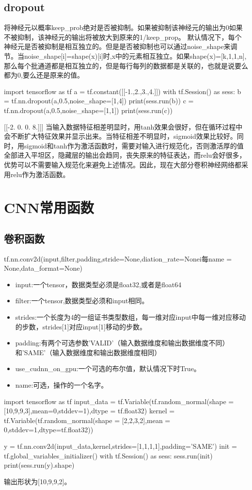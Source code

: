 \subsection{dropout}
将神经元以概率keep\_prob绝对是否被抑制。如果被抑制该神经元的输出为0如果不被抑制，该神经元的输出将被放大到原来的1/keep\_prop。
默认情况下，每个神经元是否被抑制是相互独立的。但是是否被抑制也可以通过noise\_shape来调节。当noise\_shape[i]=shape(x)[i]时,x中的元素相互独立。如果shape(x)=[k,1,1,n],那么每个批通道都是相互独立的，但是每行每列的数据都是关联的，也就是说要么都为0,要么还是原来的值。
\begin{python}
import tensorflow as tf
a = tf.constant([[-1.,2.,3.,4.]])
with tf.Session() as sess:
    b = tf.nn.dropout(a,0.5,noise_shape=[1,4])
    print(sess.run(b))
    c = tf.nn.dropout(a,0.5,noise_shape=[1,1])
    print(sess.run(c))
\end{python}
[[-2.  0.  0.  8.]]\newline
[[-0.  0.  0.  0.]]\newline
当输入数据特征相差明显时，用tanh效果会很好，但在循环过程中会不断扩大特征效果并显示出来。当特征相差不明显时，sigmoid效果比较好。同时，用sigmoid和tanh作为激活函数时，需要对输入进行规范化，否则激活厚的值全部进入平坦区，隐藏层的输出会趋同，丧失原来的特征表达，而relu会好很多，优势可以不需要输入规范化来避免上述情况。因此，现在大部分卷积神经网络都采用relu作为激活函数。
\section{CNN常用函数}
\subsection{卷积函数}
tf.nn.conv2d(input,filter,padding,stride=None,diation\_rate=Nonei每name = None,data\_format=None)\newline
\begin{itemize}
\item input:一个tensor，数据类型必须是float32,或者是float64
\item filter:一个tensor,数据类型必须和input相同。
\item strides:一个长度为4的一组证书类型数组，每一维对应input中每一维对应移动的步数，strides[1]对应input[1]移动的步数。
\item padding:有两个可选参数'VALID'（输入数据维度和输出数据维度不同）和'SAME'（输入数据维度和输出数据维度相同）
\item use\_cudnn\_on\_gpu:一个可选的布尔值，默认情况下时True。
\item name:可选，操作的一个名字。
\end{itemize}
\begin{python}
import tensorflow as tf
input_data = tf.Variable(tf.random_normal(shape = [10,9,9,3],mean=0,stddev=1),dtype = tf.float32)
kernel = tf.Variable(tf.random_normal(shape = [2,2,3,2],mean = 0,stddev=1,dtype=tf.float32))

y = tf.nn.conv2d(input_data,kernel,strides=[1,1,1,1],padding='SAME')
init = tf.global_variables_initializer()
with tf.Session() as sess:
    sess.run(init)
    print(sess.run(y).shape)
\end{python}
输出形状为[10,9,9,2]。

